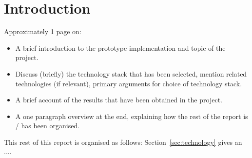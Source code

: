 \section{Introduction}
\label{sec:introduction}

Approximately 1 page on:

\begin{itemize}

\item A brief introduction to the prototype implementation and topic of the project.

\item Discuss (briefly) the technology stack that has been selected, mention related technologies (if relevant), primary arguments for choice of technology stack.

\item A brief account of the results that have been obtained in the project.

\item A one paragraph overview at the end, explaining how the rest of the report is / has been organised.

\end{itemize}

\noindent
This rest of this report is organised as follows:
Section~\ref{sec:technology} gives an ....
